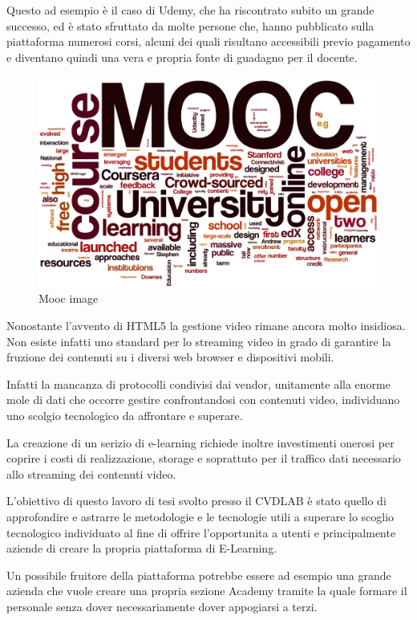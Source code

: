 Questo ad esempio è il caso di Udemy, che ha riscontrato subito un grande successo, ed è stato sfruttato da molte persone che, hanno pubblicato sulla piattaforma numerosi corsi, alcuni dei quali risultano accessibili previo pagamento e diventano quindi una vera e propria fonte di guadagno per il docente.

\begin{figure}[htb] %
 \centering
 \includegraphics[width=0.8\linewidth]{images/introduction/mooc.png}\hfill
 \caption[Mooc image]{Mooc image}
 \label{fig:fourV}
\end{figure}


Nonostante l'avvento di HTML5 la gestione video rimane ancora molto insidiosa. Non esiste infatti uno standard per lo streaming video in grado di garantire la fruzione dei contenuti su i diversi web browser e dispositivi mobili.

Infatti la mancanza di protocolli condivisi dai vendor, unitamente alla enorme mole di dati che occorre gestire confrontandosi con contenuti video, individuano uno scolgio tecnologico da affrontare e superare.

La creazione di un serizio di e-learning richiede inoltre investimenti onerosi per coprire i costi di realizzazione, storage e soprattuto per il traffico dati necessario allo streaming dei contenuti video.


L'obiettivo di questo lavoro di tesi svolto presso il CVDLAB è stato quello di approfondire e astrarre le metodologie e le tecnologie utili a superare lo scoglio tecnologico individuato al fine di offrire l'opportunita a utenti e principalmente aziende di creare la propria piattaforma di E-Learning.

Un possibile fruitore della piattaforma potrebbe essere ad esempio una grande azienda che vuole creare una propria sezione Academy tramite la quale formare il personale senza dover necessariamente dover appogiarsi a terzi. 


